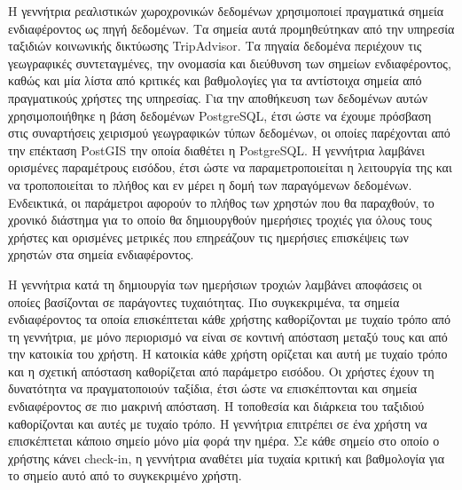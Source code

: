 Η γεννήτρια ρεαλιστικών χωροχρονικών δεδομένων χρησιμοποιεί πραγματικά σημεία \linebreak ενδιαφέροντος ως πηγή δεδομένων. Τα σημεία αυτά προμηθεύτηκαν από την υπηρεσία 
ταξιδιών κοινωνικής δικτύωσης TripAdvisor. Τα πηγαία δεδομένα περιέχουν τις γεωγραφικές συντεταγμένες, την ονομασία και διεύθυνση των σημείων ενδιαφέροντος, 
καθώς και μία λίστα από κριτικές και βαθμολογίες για τα αντίστοιχα σημεία από πραγματικούς χρήστες της υπηρεσίας. Για την αποθήκευση των δεδομένων αυτών 
χρησιμοποιήθηκε η βάση δεδομένων PostgreSQL, έτσι ώστε να έχουμε \linebreak πρόσβαση στις συναρτήσεις χειρισμού γεωγραφικών τύπων δεδομένων, οι οποίες παρέχονται 
από την επέκταση PostGIS την οποία διαθέτει η PostgreSQL. Η γεννήτρια λαμβάνει ορισμένες παραμέτρους εισόδου, έτσι ώστε να παραμετροποιείται η λειτουργία της 
και να τροποποιείται το πλήθος και εν μέρει η δομή των παραγόμενων δεδομένων. Ενδεικτικά, οι παράμετροι αφορούν το πλήθος των χρηστών που θα παραχθούν, το 
χρονικό διάστημα για το οποίο θα δημιουργθούν ημερήσιες τροχιές για όλους τους χρήστες και ορισμένες μετρικές που επηρεάζουν τις ημερήσιες επισκέψεις των χρηστών 
στα σημεία ενδιαφέροντος.

Η γεννήτρια κατά τη δημιουργία των ημερήσιων τροχιών λαμβάνει αποφάσεις οι οποίες βασίζονται σε παράγοντες τυχαιότητας. Πιο συγκεκριμένα, τα σημεία 
ενδιαφέροντος τα οποία επισκέπτεται κάθε χρήστης καθορίζονται με τυχαίο τρόπο από τη γεννήτρια, με μόνο περιορισμό να είναι σε κοντινή απόσταση μεταξύ τους και από 
την κατοικία του χρήστη. Η κατοικία κάθε χρήστη ορίζεται και αυτή με τυχαίο τρόπο και η σχετική απόσταση καθορίζεται από παράμετρο εισόδου. Οι χρήστες έχουν 
τη δυνατότητα να πραγματοποιούν ταξίδια, έτσι ώστε να επισκέπτονται και σημεία ενδιαφέροντος σε πιο μακρινή απόσταση. Η τοποθεσία και διάρκεια του ταξιδιού 
καθορίζονται και αυτές με τυχαίο τρόπο. Η γεννήτρια επιτρέπει σε ένα χρήστη να επισκέπτεται κάποιο σημείο μόνο μία φορά την ημέρα. Σε κάθε σημείο στο οποίο 
ο χρήστης κάνει check-in, η γεννήτρια αναθέτει μία τυχαία κριτική και βαθμολογία για το σημείο αυτό από το συγκεκριμένο χρήστη. 

